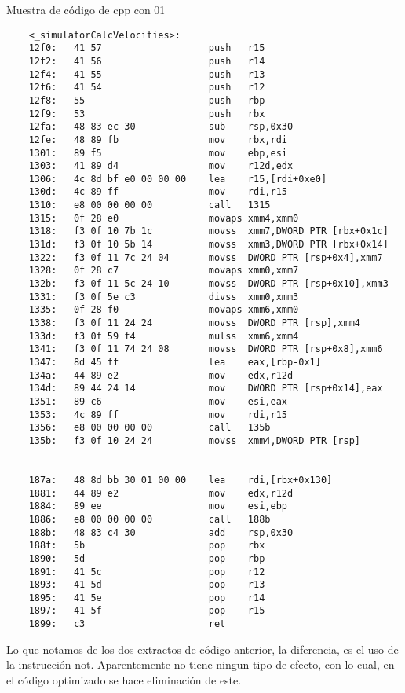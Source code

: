 Muestra de código de cpp con 01
\begin{verbatim}
    <_simulatorCalcVelocities>:
    12f0:	41 57                	push   r15
    12f2:	41 56                	push   r14
    12f4:	41 55                	push   r13
    12f6:	41 54                	push   r12
    12f8:	55                   	push   rbp
    12f9:	53                   	push   rbx
    12fa:	48 83 ec 30          	sub    rsp,0x30
    12fe:	48 89 fb             	mov    rbx,rdi
    1301:	89 f5                	mov    ebp,esi
    1303:	41 89 d4             	mov    r12d,edx
    1306:	4c 8d bf e0 00 00 00 	lea    r15,[rdi+0xe0]
    130d:	4c 89 ff             	mov    rdi,r15
    1310:	e8 00 00 00 00       	call   1315
    1315:	0f 28 e0             	movaps xmm4,xmm0
    1318:	f3 0f 10 7b 1c       	movss  xmm7,DWORD PTR [rbx+0x1c]
    131d:	f3 0f 10 5b 14       	movss  xmm3,DWORD PTR [rbx+0x14]
    1322:	f3 0f 11 7c 24 04    	movss  DWORD PTR [rsp+0x4],xmm7
    1328:	0f 28 c7             	movaps xmm0,xmm7
    132b:	f3 0f 11 5c 24 10    	movss  DWORD PTR [rsp+0x10],xmm3
    1331:	f3 0f 5e c3          	divss  xmm0,xmm3
    1335:	0f 28 f0             	movaps xmm6,xmm0
    1338:	f3 0f 11 24 24       	movss  DWORD PTR [rsp],xmm4
    133d:	f3 0f 59 f4          	mulss  xmm6,xmm4
    1341:	f3 0f 11 74 24 08    	movss  DWORD PTR [rsp+0x8],xmm6
    1347:	8d 45 ff             	lea    eax,[rbp-0x1]
    134a:	44 89 e2             	mov    edx,r12d
    134d:	89 44 24 14          	mov    DWORD PTR [rsp+0x14],eax
    1351:	89 c6                	mov    esi,eax
    1353:	4c 89 ff             	mov    rdi,r15
    1356:	e8 00 00 00 00       	call   135b
    135b:	f3 0f 10 24 24       	movss  xmm4,DWORD PTR [rsp]


    187a:	48 8d bb 30 01 00 00 	lea    rdi,[rbx+0x130]
    1881:	44 89 e2             	mov    edx,r12d
    1884:	89 ee                	mov    esi,ebp
    1886:	e8 00 00 00 00       	call   188b 
    188b:	48 83 c4 30          	add    rsp,0x30
    188f:	5b                   	pop    rbx
    1890:	5d                   	pop    rbp
    1891:	41 5c                	pop    r12
    1893:	41 5d                	pop    r13
    1895:	41 5e                	pop    r14
    1897:	41 5f                	pop    r15
    1899:	c3                   	ret 
\end{verbatim}

Lo que notamos de los dos extractos de código anterior, la diferencia, es el uso de la instrucción not. Aparentemente no tiene ningun tipo de efecto, con lo cual, en el código optimizado se hace eliminación de este.

